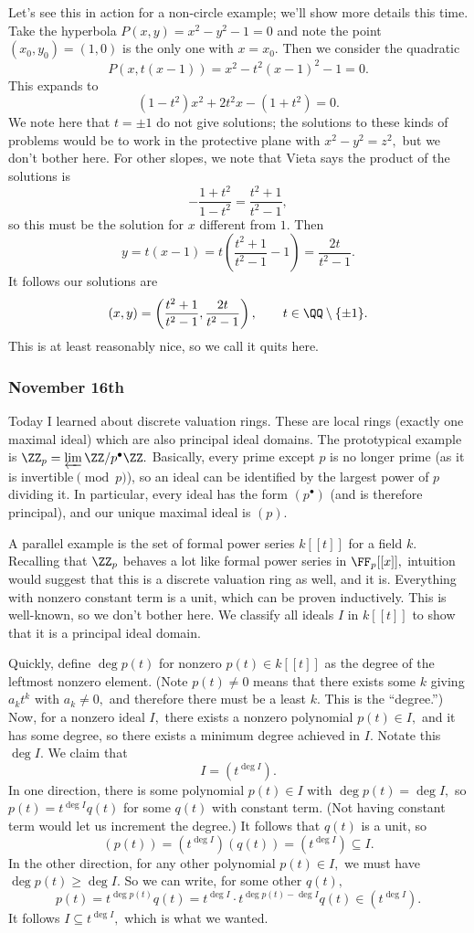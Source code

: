 Let's see this in action for a non-circle example; we'll show more details this time. Take the hyperbola $P(x,y)=x^2-y^2-1=0$ and note the point $(x_0,y_0)=(1,0)$ is the only one with $x=x_0.$ Then we consider the quadratic
\[P(x,t(x-1))=x^2-t^2(x-1)^2-1=0.\]
This expands to
\[\left(1-t^2\right)x^2+2t^2x-\left(1+t^2\right)=0.\]
We note here that $t=\pm1$ do not give solutions; the solutions to these kinds of problems would be to work in the protective plane with $x^2-y^2=z^2,$ but we don't bother here. For other slopes, we note that Vieta says the product of the solutions is
\[-\frac{1+t^2}{1-t^2}=\frac{t^2+1}{t^2-1},\]
so this must be the solution for $x$ different from $1.$ Then
\[y=t(x-1)=t\left(\frac{t^2+1}{t^2-1}-1\right)=\frac{2t}{t^2-1}.\]
It follows our solutions are
\[(x,y)=\left(\frac{t^2+1}{t^2-1},\frac{2t}{t^2-1}\right),\qquad t\in\QQ\setminus\{\pm1\}.\]
This is at least reasonably nice, so we call it quits here.

\subsubsection{November 16th}
Today I learned about discrete valuation rings. These are local rings (exactly one maximal ideal) which are also principal ideal domains. The prototypical example is $\ZZ_p=\varprojlim\ZZ/p^\bullet\ZZ.$ Basically, every prime except $p$ is no longer prime (as it is invertible$\pmod p$), so an ideal can be identified by the largest power of $p$ dividing it. In particular, every ideal has the form $(p^\bullet)$ (and is therefore principal), and our unique maximal ideal is $(p).$

A parallel example is the set of formal power series $k[[t]]$ for a field $k.$ Recalling that $\ZZ_p$ behaves a lot like formal power series in $\FF_p[[x]],$ intuition would suggest that this is a discrete valuation ring as well, and it is. Everything with nonzero constant term is a unit, which can be proven inductively. This is well-known, so we don't bother here. We classify all ideals $I$ in $k[[t]]$ to show that it is a principal ideal domain.

Quickly, define $\deg p(t)$ for nonzero $p(t)\in k[[t]]$ as the degree of the leftmost nonzero element. (Note $p(t)\ne0$ means that there exists some $k$ giving $a_kt^k$ with $a_k\ne0,$ and therefore there must be a least $k.$ This is the ``degree.'') Now, for a nonzero ideal $I,$ there exists a nonzero polynomial $p(t)\in I,$ and it has some degree, so there exists a minimum degree achieved in $I.$ Notate this $\deg I.$ We claim that
\[I=\left(t^{\deg I}\right).\]
In one direction, there is some polynomial $p(t)\in I$ with $\deg p(t)=\deg I,$ so $p(t)=t^{\deg I}q(t)$ for some $q(t)$ with constant term. (Not having constant term would let us increment the degree.) It follows that $q(t)$ is a unit, so
\[(p(t))=\left(t^{\deg I}\right)(q(t))=\left(t^{\deg I}\right)\subseteq I.\]
In the other direction, for any other polynomial $p(t)\in I,$ we must have $\deg p(t)\ge\deg I.$ So we can write, for some other $q(t),$
\[p(t)=t^{\deg p(t)}q(t)=t^{\deg I}\cdot t^{\deg p(t)-\deg I}q(t)\in\left(t^{\deg I}\right).\]
It follows $I\subseteq t^{\deg I},$ which is what we wanted.

